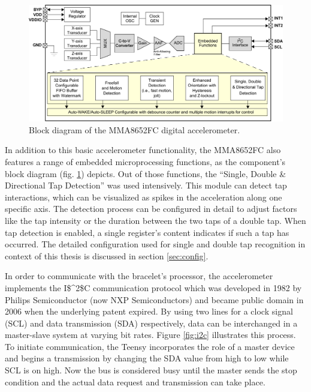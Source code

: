 \begin{figure}[bth]
	\myfloatalign
	\includegraphics[width=\linewidth]{gfx/accel.pdf}
	\caption[Block diagram of the MMA8652FC digital accelerometer]{Block diagram of the MMA8652FC digital accelerometer. \cite{datasheet:mma8652}} \label{fig:accel}
\end{figure}

In addition to this basic accelerometer functionality, the MMA8652FC also features a range of embedded microprocessing functions, as the component's block diagram (fig. \ref{fig:accel}) depicts. Out of those functions, the ``Single, Double \& Directional Tap Detection'' was used intensively. This module can detect tap interactions, which can be visualized as spikes in the acceleration along one specific axis. The detection process can be configured in detail to adjust factors like the tap intensity or the duration between the two taps of a double tap. When tap detection is enabled, a single register's content indicates if such a tap has occurred. The detailed configuration used for single and double tap recognition in context of this thesis is discussed in section \ref{sec:config}.

In order to communicate with the bracelet's processor, the accelerometer implements the \ac{I$^2$C} communication protocol which was developed in 1982 by Philips Semiconductor (now NXP Semiconductors) and became public domain in 2006 when the underlying patent expired. By using two lines for a clock signal (\textsc{SCL}) and data transmission (\textsc{SDA}) respectively, data can be interchanged in a master-slave system at varying bit rates. Figure \ref{fig:i2c} illustrates this process. To initiate communication, the Teensy incorporates the role of a master device and begins a transmission by changing the \textsc{SDA} value from high to low while \textsc{SCL} is on high. Now the bus is considered busy until the master sends the stop condition and the actual data request and transmission can take place.

